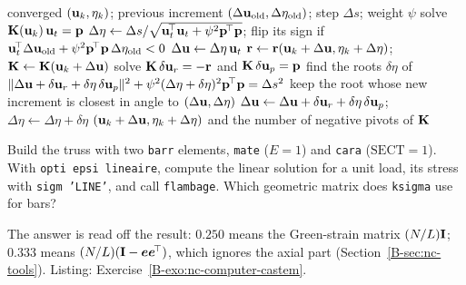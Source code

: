 \begin{algorithm}[ht]
\caption{Arc-length step by bordering (Crisfield's sphere)}\label{alg:nc-arc}
\begin{algorithmic}[1]
\Require converged $(\mathbf{u}_k,\eta_k)$; previous increment $(\Delta\mathbf{u}_{\mathrm{old}},\Delta\eta_{\mathrm{old}})$; step $\Delta s$; weight $\psi$
\State solve $\mathbf{K}(\mathbf{u}_k)\,\mathbf{u}_t = \mathbf{p}$
\State $\Delta\eta \gets \Delta s/\sqrt{\mathbf{u}_t^{\!\top}\mathbf{u}_t + \psi^2\mathbf{p}^{\!\top}\mathbf{p}}$; flip its sign if $\mathbf{u}_t^{\!\top}\Delta\mathbf{u}_{\mathrm{old}} + \psi^2\mathbf{p}^{\!\top}\mathbf{p}\,\Delta\eta_{\mathrm{old}} < 0$
\State $\Delta\mathbf{u} \gets \Delta\eta\,\mathbf{u}_t$ 
\Repeat {}
  \State $\mathbf{r} \gets \mathbf{r}(\mathbf{u}_k + \Delta\mathbf{u}, \eta_k + \Delta\eta)$;\quad $\mathbf{K} \gets \mathbf{K}(\mathbf{u}_k + \Delta\mathbf{u})$
  \State solve $\mathbf{K}\,\delta\mathbf{u}_r = -\mathbf{r}$ and $\mathbf{K}\,\delta\mathbf{u}_p = \mathbf{p}$ 
  \State find the roots $\delta\eta$ of $\lVert \Delta\mathbf{u} + \delta\mathbf{u}_r + \delta\eta\,\delta\mathbf{u}_p\rVert^2 + \psi^2(\Delta\eta + \delta\eta)^2\mathbf{p}^{\!\top}\mathbf{p} = \Delta s^2$
  \State keep the root whose new increment is closest in angle to $(\Delta\mathbf{u},\Delta\eta)$
  \State $\Delta\mathbf{u} \gets \Delta\mathbf{u} + \delta\mathbf{u}_r + \delta\eta\,\delta\mathbf{u}_p$;\quad $\Delta\eta \gets \Delta\eta + \delta\eta$
 
\State \Return $(\mathbf{u}_k + \Delta\mathbf{u}, \eta_k + \Delta\eta)$ and the number of negative pivots of $\mathbf{K}$
\end{algorithmic}
\end{algorithm}


\qc Build the truss with two \texttt{barr} elements, \texttt{mate} ($E = 1$) and \texttt{cara}
($\mathrm{SECT} = 1$). With \texttt{opti epsi lineaire}, compute the linear solution for a unit load,
its stress with \texttt{sigm 'LINE'}, and call \texttt{flambage}. Which geometric matrix does
\texttt{ksigma} use for bars?
\begin{answer}
The answer is read off the result: $0.250$ means the Green-strain matrix $(N/L)\mathbf{I}$;
$0.333$ means $(N/L)(\mathbf{I} - \bm{e}\bm{e}^{\!\top})$, which ignores the axial part (Section~\ref{B-sec:nc-tools}).
Listing: Exercise~\ref{B-exo:nc-computer-castem}.
\end{answer}

